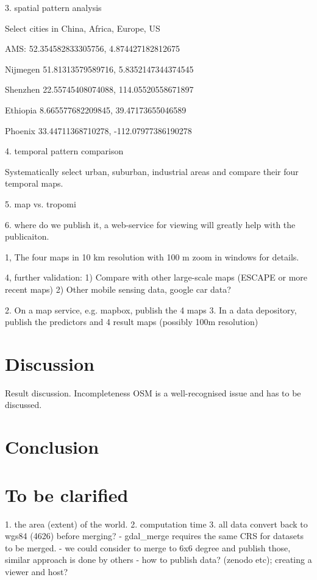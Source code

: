 \documentclass{article}
\begin{document}
3. spatial pattern analysis

Select cities in China, Africa, Europe, US

AMS:
52.354582833305756, 4.874427182812675

Nijmegen
51.81313579589716, 5.8352147344374545

Shenzhen
22.55745408074088, 114.05520558671897

Ethiopia
8.665577682209845, 39.47173655046589

Phoenix
33.44711368710278, -112.07977386190278

4. temporal pattern comparison

Systematically select urban, suburban, industrial areas and compare their four temporal maps. 

5. map vs. tropomi 

6. where do we publish it, a web-service for viewing will greatly help with the publicaiton. 


1, The four maps in 10 km resolution with 100 m zoom in windows for details. 


					
4, further validation: 
1)	Compare with other large-scale maps (ESCAPE or more recent maps)
2)	Other mobile sensing data, google car data? 

2.	On a map service, e.g. mapbox, publish the 4 maps
3.	In a data depository, publish the predictors and 4 result maps (possibly 100m resolution)

\section{Discussion}
Result discussion. 
Incompleteness OSM is a well-recognised issue and has to be discussed. 

\section{Conclusion}



 \section{To be clarified}

 1. the area (extent) of the world.   
 2. computation time
 3. all data convert back to wgs84 (4626) before merging?
 - gdal\_merge requires the same CRS for datasets to be merged. 
- we could consider to merge to 6x6 degree and publish those, similar approach is done by others
- how to publish data? (zenodo etc); creating a viewer and host?
\end{document}
